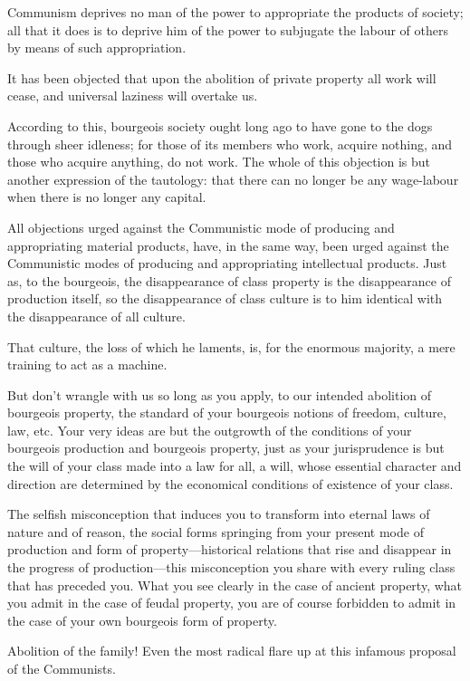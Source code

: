 Communism deprives no man of the power to appropriate the products of
society; all that it does is to deprive him of the power to subjugate
the labour of others by means of such appropriation.

It has been objected that upon the abolition of private property all
work will cease, and universal laziness will overtake us.

According to this, bourgeois society ought long ago to have gone to the
dogs through sheer idleness; for those of its members who work, acquire
nothing, and those who acquire anything, do not work. The whole of this
objection is but another expression of the tautology: that there can no
longer be any wage-labour when there is no longer any capital.

All objections urged against the Communistic mode of producing and
appropriating material products, have, in the same way, been urged
against the Communistic modes of producing and appropriating
intellectual products. Just as, to the bourgeois, the disappearance of
class property is the disappearance of production itself, so the
disappearance of class culture is to him identical with the
disappearance of all culture.

That culture, the loss of which he laments, is, for the enormous
majority, a mere training to act as a machine.

But don’t wrangle with us so long as you apply, to our intended
abolition of bourgeois property, the standard of your bourgeois notions
of freedom, culture, law, etc. Your very ideas are but the outgrowth of
the conditions of your bourgeois production and bourgeois property,
just as your jurisprudence is but the will of your class made into a
law for all, a will, whose essential character and direction are
determined by the economical conditions of existence of your class.

The selfish misconception that induces you to transform into eternal
laws of nature and of reason, the social forms springing from your
present mode of production and form of property—historical relations
that rise and disappear in the progress of production—this
misconception you share with every ruling class that has preceded you.
What you see clearly in the case of ancient property, what you admit in
the case of feudal property, you are of course forbidden to admit in
the case of your own bourgeois form of property.

Abolition of the family! Even the most radical flare up at this
infamous proposal of the Communists.

